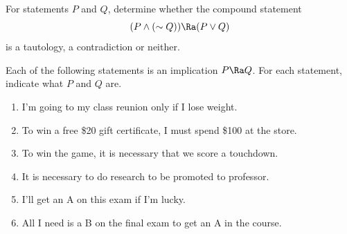 \documentclass{homework}
\begin{document}

\question For statements $P$ and $Q$, determine whether the compound statement
\[
    (P \wedge (\sim Q)) \Ra (P \vee Q)
\]
is a tautology, a contradiction or neither.


\question Each of the following statements is an implication $P \Ra Q$. For each statement, indicate what $P$ and $Q$ are.
\begin{enumerate}[label=(\alph*)]
    \item I'm going to my class reunion only if I lose weight.


    \item To win a free \$20 gift certificate, I must spend \$100 at the store.


    \item To win the game, it is necessary that we score a touchdown.


    \item It is necessary to do research to be promoted to professor.


    \item I’ll get an A on this exam if I’m lucky.


    \item All I need is a B on the final exam to get an A in the course.

\end{enumerate}
\end{document}
